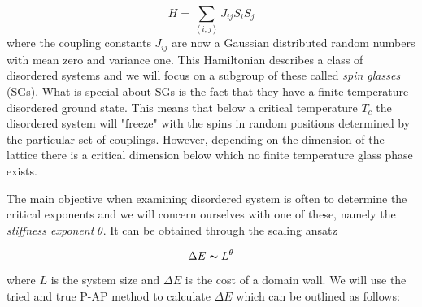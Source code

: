 \documentclass[paper=a4, fontsize=11pt]{scrartcl} %
\numberwithin{equation}{section} %
\numberwithin{figure}{section} %
\numberwithin{table}{section} %
\begin{document}
\begin{equation}
H=\sum\limits_{\left\langle i,j \right\rangle} J_{ij} S_{i} S_{j}
\end{equation}
where the coupling constants $J_{ij}$ are now a Gaussian distributed random numbers with mean zero and variance one. This Hamiltonian describes a class of disordered systems and we will focus on a subgroup of these called \emph{spin glasses} (SGs). What is special about SGs is the fact that they have a finite temperature disordered ground state. This means that below a critical temperature $T_c$ the disordered system will "freeze" with the spins in random positions determined by the particular set of couplings. However, depending on the dimension of the lattice there is a critical dimension below which no finite temperature glass phase exists\cite{almeida}.

The main objective when examining disordered system is often to determine the critical exponents and we will concern ourselves with one of these, namely the \emph{stiffness exponent} $\theta$. It can be obtained through the scaling ansatz

\begin{equation}
\Delta E \thicksim L^\theta
\label{eq:scaling}
\end{equation}
where $L$ is the system size and $\Delta E$ is the cost of a domain wall. We will use the tried and true P-AP method\cite{hartmann}\cite{carter} to calculate $\Delta E$ which can be outlined as follows:
\end{document}
